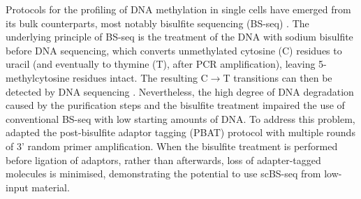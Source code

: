 Protocols for the profiling of DNA methylation in single cells have emerged from its bulk counterparts, most notably bisulfite sequencing (BS-seq) \cite{Smallwood2014,Guo2013,Gravina2016,Farlik2015}. The underlying principle of BS-seq is the treatment of the DNA with sodium bisulfite before DNA sequencing, which converts unmethylated cytosine (C) residues to uracil (and eventually to thymine (T), after PCR amplification), leaving 5-methylcytosine residues intact. The resulting C$\to$T transitions can then be detected by DNA sequencing \cite{Frommer1992,Clark2016,Clark2017}. Nevertheless, the high degree of DNA degradation caused by the purification steps and the bisulfite treatment impaired the use of conventional BS-seq with low starting amounts of DNA. To address this problem, \cite{Smallwood2014} adapted the post-bisulfite adaptor tagging (PBAT) protocol with multiple rounds of 3' random primer amplification. When the bisulfite treatment is performed before ligation of adaptors, rather than afterwards, loss of adapter-tagged molecules is minimised, demonstrating the potential to use scBS-seq from low-input material. 



